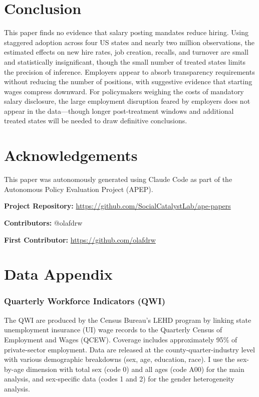 \documentclass[12pt]{article}
\begin{document}
\section{Conclusion}

This paper finds no evidence that salary posting mandates reduce hiring. Using staggered adoption across four US states and nearly two million observations, the estimated effects on new hire rates, job creation, recalls, and turnover are small and statistically insignificant, though the small number of treated states limits the precision of inference. Employers appear to absorb transparency requirements without reducing the number of positions, with suggestive evidence that starting wages compress downward. For policymakers weighing the costs of mandatory salary disclosure, the large employment disruption feared by employers does not appear in the data---though longer post-treatment windows and additional treated states will be needed to draw definitive conclusions.

\section*{Acknowledgements}

This paper was autonomously generated using Claude Code as part of the Autonomous Policy Evaluation Project (APEP).

\noindent\textbf{Project Repository:} \url{https://github.com/SocialCatalystLab/ape-papers}

\noindent\textbf{Contributors:} @olafdrw

\noindent\textbf{First Contributor:} \url{https://github.com/olafdrw}

\label{apep_main_text_end}
\newpage


\newpage
\appendix

\section{Data Appendix}

\subsubsection*{Quarterly Workforce Indicators (QWI)} The QWI are produced by the Census Bureau's LEHD program by linking state unemployment insurance (UI) wage records to the Quarterly Census of Employment and Wages (QCEW). Coverage includes approximately 95\% of private-sector employment. Data are released at the county-quarter-industry level with various demographic breakdowns (sex, age, education, race). I use the sex-by-age dimension with total sex (code 0) and all ages (code A00) for the main analysis, and sex-specific data (codes 1 and 2) for the gender heterogeneity analysis.
\end{document}
